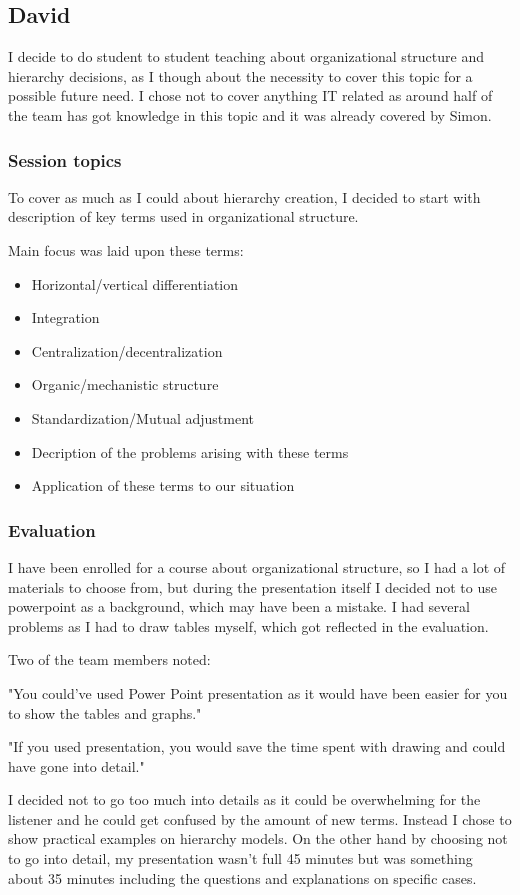 \subsection{David}
I decide to do student to student teaching about organizational structure and hierarchy decisions, as I though about the necessity to cover this topic for a possible future need. I chose not to cover anything IT related as around half of the team has got knowledge in this topic and it was already covered by Simon.

\subsubsection{Session topics}
To cover as much as I could about hierarchy creation, I decided to start with description of key terms used in organizational structure.

Main focus was laid upon these terms:
\begin{itemize}
\item Horizontal/vertical differentiation
\item Integration
\item Centralization/decentralization
\item Organic/mechanistic structure
\item Standardization/Mutual adjustment
\item Decription of the problems arising with these terms
\item Application of these terms to our situation
\end{itemize}

\subsubsection{Evaluation}
I have been enrolled for a course about organizational structure, so I had a lot of materials to choose from, but during the presentation itself I decided not to use powerpoint as a background, which may have been a mistake. I had several problems as I had to draw tables myself, which got reflected in the evaluation.

Two of the team members noted:

"You could've used Power Point presentation as it would have been easier for you to show the tables and graphs."

"If you used presentation, you would save the time spent with drawing and could have gone into detail."

I decided not to go too much into details as it could be overwhelming for the listener and he could get confused by the amount of new terms. Instead I chose to show practical examples on hierarchy models. On the other hand by choosing not to go into detail, my presentation wasn't full 45 minutes but was something about 35 minutes including the questions and explanations on specific cases.

